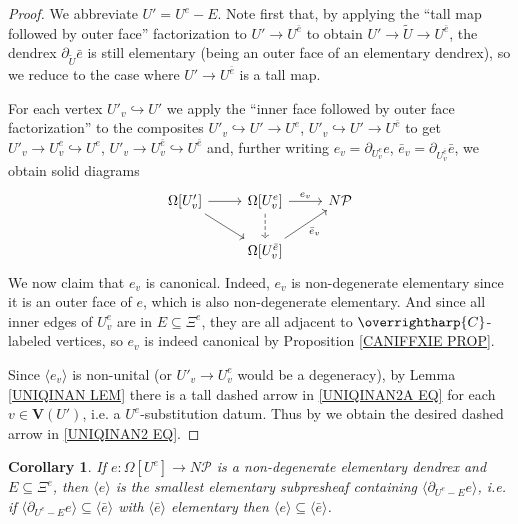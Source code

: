 \documentclass[a4paper,10pt]{article}%
\numberwithin{equation}{section}
\numberwithin{figure}{section}
\newtheorem{corollary}[equation]{Corollary}%
\theoremstyle{definition} %
\newcommand{\vect}[1]{\text{\overrightharp{\ensuremath{#1}}}}
\newcommand{\1}{\ensuremath{\mathbbm 1}}%
\begin{document}
\begin{proof}
	We abbreviate $U' = U^e -E$. 
	Note first that, 
	by applying the
	``tall map followed by outer face'' factorization to
	$U' \to U^{\bar{e}}$
	to obtain
	$U' \to \tilde{U} \to U^{\bar{e}}$,
	the dendrex $\partial_{\tilde{U}} \bar{e}$
	is still elementary (being an outer face of an elementary dendrex),
	so we reduce to the case where $U' \to U^{\bar{e}}$ is a tall map.
	
	For each vertex $U'_v \hookrightarrow U'$ we apply the 
	``inner face followed by outer face factorization''
	to the composites
	$U'_{v} \hookrightarrow U' \to U^{e}$,
	$U'_{v} \hookrightarrow U' \to U^{\bar{e}}$
	to get
	$U'_{v} \to U_{v}^e \hookrightarrow U^e$,
	$U'_{v} \to U_{v}^{\bar{e}} \hookrightarrow U^{\bar{e}}$
	and, further writing
	$e_v = \partial_{U^e_v} e$,
	$\bar{e}_v = \partial_{U^{\bar{e}}_v} \bar{e}$, 
	we obtain solid diagrams
	\begin{equation}\label{UNIQINAN2A EQ}
	\begin{tikzcd}
	\Omega[U'_v] \ar{r} \ar{rd}&
	\Omega[U^e_v] \ar{r}{e_v} \ar[dashed]{d} &
	N \mathcal{P}
	\\
	&
	\Omega[U^{\bar{e}}_v] \ar{ru}[swap]{\bar{e}_v} 
	\end{tikzcd}
	\end{equation}
	We now claim that $e_v$ is canonical. Indeed, $e_v$ is non-degenerate elementary since it is an outer face of $e$, which is also non-degenerate elementary. And since all inner edges of $U^e_v$ are in 
	$E \subseteq \Xi^e$, they are all adjacent to $\vect{C}$-labeled vertices, 
	so $e_v$
	is indeed canonical by
	Proposition \ref{CANIFFXIE PROP}.
	
	
	Since $\langle e_v \rangle$ is non-unital
	(or $U'_v \to U_v^e$ would be a degeneracy),
	by Lemma \ref{UNIQINAN LEM} there is a tall dashed arrow in \eqref{UNIQINAN2A EQ} for each $v \in \boldsymbol{V}(U')$,
	i.e. a $U^e$-substitution datum. Thus
	by
	\cite[Prop. 3.41]{BP_geo}
	we obtain the desired dashed arrow in \eqref{UNIQINAN2 EQ}.
\end{proof}



\begin{corollary}\label{MINELEMSH COR}
	If $e \colon \Omega[U^e] \to N \mathcal{P}$ is a non-degenerate elementary dendrex
	and $E \subseteq \Xi^e$,
	then 
	$\langle e\rangle$ is the smallest elementary subpresheaf
	containing $\langle \partial_{U^e - E} e\rangle$,
	i.e. if 
	$\langle \partial_{U^e - E} e\rangle
	\subseteq \langle \bar{e} \rangle$
	with $\langle \bar{e} \rangle$
	elementary then 
	$\langle e\rangle
	\subseteq \langle \bar{e} \rangle$.
\end{corollary}
\end{document}
